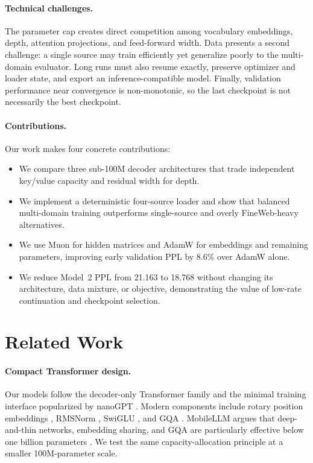 \documentclass{article}
\begin{document}
\paragraph{Technical challenges.}
The parameter cap creates direct competition among vocabulary embeddings,
depth, attention projections, and feed-forward width. Data presents a second
challenge: a single source may train efficiently yet generalize poorly to the
multi-domain evaluator. Long runs must also resume exactly, preserve optimizer
and loader state, and export an inference-compatible model. Finally, validation
performance near convergence is non-monotonic, so the last checkpoint is not
necessarily the best checkpoint.

\paragraph{Contributions.}
Our work makes four concrete contributions:
\begin{itemize}
  \item We compare three sub-100M decoder architectures that trade independent
  key/value capacity and residual width for depth.
  \item We implement a deterministic four-source loader and show that balanced
  multi-domain training outperforms single-source and overly FineWeb-heavy
  alternatives.
  \item We use Muon for hidden matrices and AdamW for embeddings and remaining
  parameters, improving early validation PPL by 8.6\% over AdamW alone.
  \item We reduce Model~2 PPL from 21.163 to 18.768 without changing its
  architecture, data mixture, or objective, demonstrating the value of
  low-rate continuation and checkpoint selection.
\end{itemize}

\section{Related Work}
\label{sec:related}

\paragraph{Compact Transformer design.}
Our models follow the decoder-only Transformer family
\citep{vaswani2017attention} and the minimal training interface popularized by
nanoGPT \citep{karpathy2022nanogpt}. Modern components include rotary position
embeddings \citep{su2021roformer}, RMSNorm \citep{zhang2019root}, SwiGLU
\citep{shazeer2020glu}, and GQA \citep{ainslie2023gqa}. MobileLLM argues that
deep-and-thin networks, embedding sharing, and GQA are particularly effective
below one billion parameters \citep{liu2024mobilellm}. We test the same
capacity-allocation principle at a smaller 100M-parameter scale.
\end{document}

